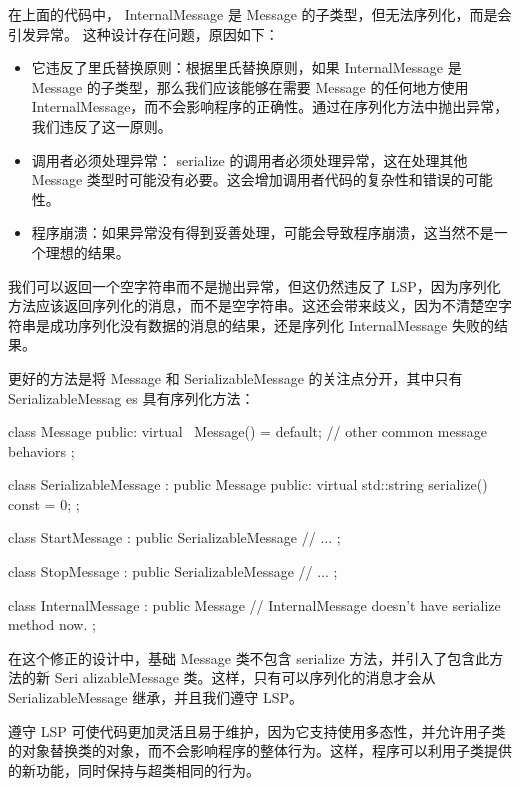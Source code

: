 在上面的代码中， InternalMessage 是 Message 的子类型，但无法序列化，而是会引发异常。
这种设计存在问题，原因如下：

\begin{itemize}
\item
它违反了里氏替换原则：根据里氏替换原则，如果 InternalMessage 是 Message 的子类型，那么我们应该能够在需要 Message 的任何地方使用 InternalMessage，而不会影响程序的正确性。通过在序列化方法中抛出异常，我们违反了这一原则。

\item
调用者必须处理异常： serialize 的调用者必须处理异常，这在处理其他 Message 类型时可能没有必要。这会增加调用者代码的复杂性和错误的可能性。

\item
程序崩溃：如果异常没有得到妥善处理，可能会导致程序崩溃，这当然不是一个理想的结果。
\end{itemize}

我们可以返回一个空字符串而不是抛出异常，但这仍然违反了 LSP，因为序列化方法应该返回序列化的消息，而不是空字符串。这还会带来歧义，因为不清楚空字符串是成功序列化没有数据的消息的结果，还是序列化 InternalMessage 失败的结果。

更好的方法是将 Message 和 SerializableMessage 的关注点分开，其中只有 SerializableMessag es 具有序列化方法：

\begin{cpp}
class Message {
public:
    virtual ~Message() = default;
    // other common message behaviors
};

class SerializableMessage : public Message {
public:
    virtual std::string serialize() const = 0;
};

class StartMessage : public SerializableMessage {
    // ...
};

class StopMessage : public SerializableMessage {
    // ...
};

class InternalMessage : public Message {
    // InternalMessage doesn't have serialize method now.
};
\end{cpp}

在这个修正的设计中，基础 Message 类不包含 serialize 方法，并引入了包含此方法的新 Seri alizableMessage 类。这样，只有可以序列化的消息才会从 SerializableMessage 继承，并且我们遵守 LSP。

遵守 LSP 可使代码更加灵活且易于维护，因为它支持使用多态性，并允许用子类的对象替换类的对象，而不会影响程序的整体行为。这样，程序可以利用子类提供的新功能，同时保持与超类相同的行为。


